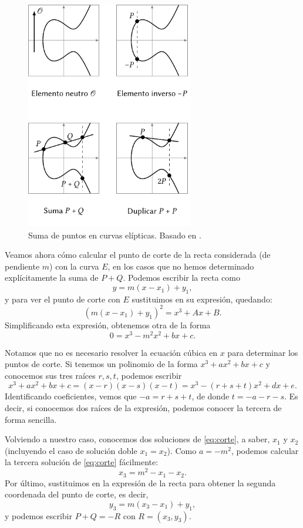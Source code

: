 \documentclass[
  a4paper,
  12pt,
  spanish,
]{scrartcl}
\begin{document}
\begin{figure}[h]
  \centering
  \includegraphics[width=0.65\textwidth]{img/operaciones-curvas}
  \caption{Suma de puntos en curvas elípticas. Basado en  \parencite{eichlseder_elliptic_2016}.}
  \label{fig:operaciones-curvas}
\end{figure}

Veamos ahora cómo calcular el punto de corte de la recta considerada (de pendiente $m$) con la curva $E$, en los casos que no hemos determinado explícitamente la suma de $P+Q$. Podemos escribir la recta como \[ y = m(x - x_1) + y_1, \] y para ver el punto de corte con $E$ sustituimos en su expresión, quedando: \[ (m(x - x_1) + y_1)^2 = x^3 + Ax + B. \] Simplificando esta expresión, obtenemos otra de la forma
\begin{equation}
    \label{eq:corte}
	0 = x^3 - m^2x^2 + bx + c.
\end{equation} 

    Notamos que no es necesario resolver la ecuación cúbica en $x$ para determinar los puntos de corte. Si tenemos un polinomio de la forma $x^3 + ax^2 + bx + c$ y conocemos sus tres raíces $r,s,t$, podemos escribir \[ x^3 + ax^2 + bx + c = (x-r)(x-s)(x-t) = x^3 - (r+s+t)x^2 + dx + e. \] Identificando coeficientes, vemos que $-a = r + s + t$, de donde $t = -a -r -s$. Es decir, si conocemos dos raíces de la expresión, podemos conocer la tercera de forma sencilla.
    
    Volviendo a nuestro caso, conocemos dos soluciones de \eqref{eq:corte}, a saber, $x_1$ y $x_2$ (incluyendo el caso de solución doble $x_1=x_2$). Como $a = -m^2$, podemos calcular la tercera solución de \eqref{eq:corte} fácilmente: \[ x_3 = m^2 - x_1 - x_2. \] Por último, sustituimos en la expresión de la recta para obtener la segunda coordenada del punto de corte, es decir, \[y_3 = m(x_3 - x_1) + y_1, \] y podemos escribir $P+Q = -R$ con $R=(x_3, y_3)$.
    
\end{document}
